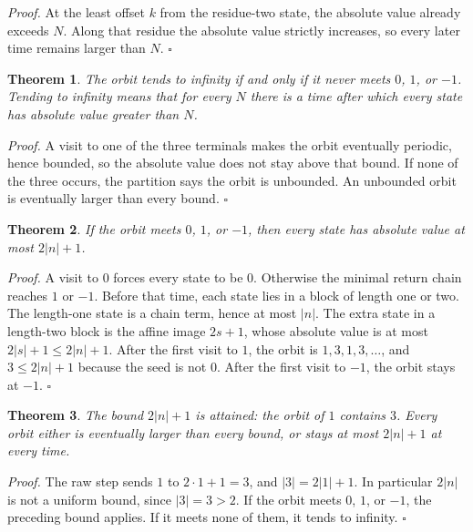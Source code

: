 \documentclass[11pt,letterpaper]{article}
\newtheorem{theorem}{Theorem}
\newenvironment{proof}{\noindent\textit{Proof.}}{\hfill\(\square\)}
\begin{document}
\begin{proof}
At the least offset \(k\) from the residue-two state, the absolute value already exceeds \(N\). Along that residue the absolute value strictly increases, so every later time remains larger than \(N\).
\end{proof}

\begin{theorem}
\label{thm:infinity}
The orbit tends to infinity if and only if it never meets \(0\), \(1\), or \(-1\). Tending to infinity means that for every \(N\) there is a time after which every state has absolute value greater than \(N\).
\end{theorem}

\begin{proof}
A visit to one of the three terminals makes the orbit eventually periodic, hence bounded, so the absolute value does not stay above that bound. If none of the three occurs, the partition says the orbit is unbounded. An unbounded orbit is eventually larger than every bound.
\end{proof}

\begin{theorem}
\label{thm:terminalabs}
If the orbit meets \(0\), \(1\), or \(-1\), then every state has absolute value at most \(2|n|+1\).
\end{theorem}

\begin{proof}
A visit to \(0\) forces every state to be \(0\). Otherwise the minimal return chain reaches \(1\) or \(-1\). Before that time, each state lies in a block of length one or two. The length-one state is a chain term, hence at most \(|n|\). The extra state in a length-two block is the affine image \(2s+1\), whose absolute value is at most \(2|s|+1\le 2|n|+1\). After the first visit to \(1\), the orbit is \(1,3,1,3,\ldots\), and \(3\le 2|n|+1\) because the seed is not \(0\). After the first visit to \(-1\), the orbit stays at \(-1\).
\end{proof}

\begin{theorem}
\label{thm:dichotomy}
The bound \(2|n|+1\) is attained: the orbit of \(1\) contains \(3\). Every orbit either is eventually larger than every bound, or stays at most \(2|n|+1\) at every time.
\end{theorem}

\begin{proof}
The raw step sends \(1\) to \(2\cdot 1+1=3\), and \(|3|=2|1|+1\). In particular \(2|n|\) is not a uniform bound, since \(|3|=3>2\). If the orbit meets \(0\), \(1\), or \(-1\), the preceding bound applies. If it meets none of them, it tends to infinity.
\end{proof}
\end{document}

